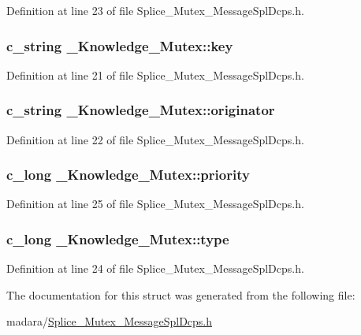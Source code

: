 Definition at line 23 of file Splice\_\-Mutex\_\-MessageSplDcps.h.

\hypertarget{struct__Knowledge__Mutex_ab8099fb08c35e3ab6b8062520337dfdb}{
\subsubsection[{key}]{\setlength{\rightskip}{0pt plus 5cm}c\_\-string {\bf \_\-Knowledge\_\-Mutex::key}}}
\label{dd/d1e/struct__Knowledge__Mutex_ab8099fb08c35e3ab6b8062520337dfdb}


Definition at line 21 of file Splice\_\-Mutex\_\-MessageSplDcps.h.

\hypertarget{struct__Knowledge__Mutex_a6138eb4fcdd84548dcc4a21073552e67}{
\subsubsection[{originator}]{\setlength{\rightskip}{0pt plus 5cm}c\_\-string {\bf \_\-Knowledge\_\-Mutex::originator}}}
\label{dd/d1e/struct__Knowledge__Mutex_a6138eb4fcdd84548dcc4a21073552e67}


Definition at line 22 of file Splice\_\-Mutex\_\-MessageSplDcps.h.

\hypertarget{struct__Knowledge__Mutex_a6b28be59607195007f7a70bf4d455cf1}{
\subsubsection[{priority}]{\setlength{\rightskip}{0pt plus 5cm}c\_\-long {\bf \_\-Knowledge\_\-Mutex::priority}}}
\label{dd/d1e/struct__Knowledge__Mutex_a6b28be59607195007f7a70bf4d455cf1}


Definition at line 25 of file Splice\_\-Mutex\_\-MessageSplDcps.h.

\hypertarget{struct__Knowledge__Mutex_a73077f5d286716cab47c318fcaebd033}{
\subsubsection[{type}]{\setlength{\rightskip}{0pt plus 5cm}c\_\-long {\bf \_\-Knowledge\_\-Mutex::type}}}
\label{dd/d1e/struct__Knowledge__Mutex_a73077f5d286716cab47c318fcaebd033}


Definition at line 24 of file Splice\_\-Mutex\_\-MessageSplDcps.h.



The documentation for this struct was generated from the following file:\begin{DoxyCompactItemize}
\item 
madara/\hyperlink{Splice__Mutex__MessageSplDcps_8h}{Splice\_\-Mutex\_\-MessageSplDcps.h}\end{DoxyCompactItemize}
